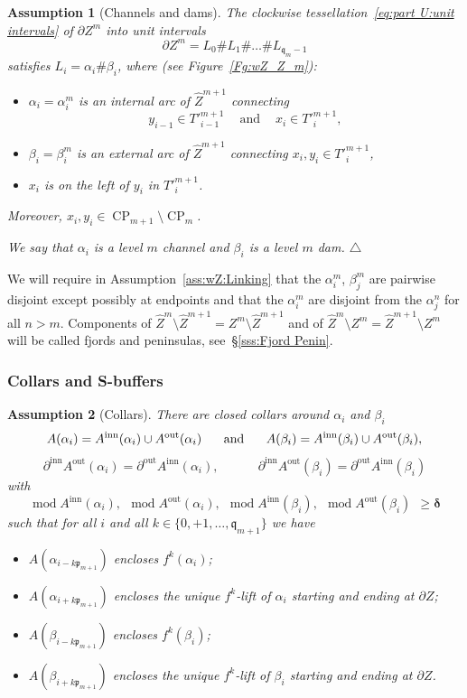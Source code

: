 \documentclass{amsart}
\newcommand\xqed[1]{%
  \leavevmode\unskip\penalty9999 \hbox{}\nobreak\hfill
  \quad\hbox{#1}}
\newcommand\tqed{\xqed{$\triangle$}}
\renewcommand{\sp}{{\ \ }}
\newcommand{\1}{{\mathbb 1 }}
\newcommand{\reminder}[1]{\textsl{$\lhd\rhd$#1$\lhd\rhd$}\marginpar{$\lhd\rhd\lhd\rhd\lhd\rhd$}}
\newcommand{\wZ}{{\widehat Z}}
\newcommand{\pp}{\mathfrak{p}}
\newcommand{\qq}{\mathfrak{q}}
\newcommand\inn{{\operatorname{inn}}}
\newcommand\out{{\operatorname{out}}}
\newtheorem{assum}{Assumption}
\theoremstyle{remark}
\numberwithin{equation}{section}
\theoremstyle{definition}
\renewcommand{\mod}{\operatorname{mod}}
\newcommand{\CP}{{\operatorname{CP}}}
\newcommand{\bdelta}{{\boldsymbol{ \delta}}}
\begin{document}
\begin{assum}[Channels and dams]
\label{ass:wZ:2}
The clockwise tessellation~\eqref{eq:part U:unit intervals} of $\partial Z^m$ into unit intervals
\[\partial Z^m=L_0\#L_1\#\dots\# L_{\qq_m-1}\] satisfies $L_i=\alpha_i\#\beta_i$, where (see Figure~\ref{Fg:wZ_Z_m}): 
\begin{itemize}
\item $\alpha_i=\alpha_i^m$ is an internal arc of $\widehat Z^{m+1}$ connecting \[y_{i-1}\in T'^{m+1}_{i-1} \sp\sp \text{ and }\sp\sp x_{i}\in  T'^{m+1}_{i},\]  
\item  $\beta_i=\beta_i^m$ is an external arc of $\widehat Z^{m+1}$ connecting $x_{i},y_{i}\in T'^{m+1}_{i}$,
\item $x_i$ is on the left of $y_i$ in $T'^{m+1}_i$.
\end{itemize}
Moreover, $x_i,y_i \in \CP_{m+1}\setminus \CP_m$.


We say that $\alpha_i$ is a \emph{level $m$ channel} and  $\beta_i$ is a \emph{level $m$ dam}.\tqed
\end{assum}

We will require in Assumption~\ref{ass:wZ:Linking} that the $\alpha^m_i$, $\beta^m_j$ are pairwise disjoint except possibly at endpoints and that the $\alpha^m_i$ are disjoint from the $\alpha^n_j$ for all $n>m$. Components of $\wZ^m\setminus \wZ^{m+1}=Z^m\setminus\wZ^{m+1} $ and of $\wZ^{m}\setminus Z^m=\wZ^{m+1}\setminus Z^m$ will be called fjords and peninsulas, see~\S\ref{sss:Fjord Penin}.





\subsubsection{Collars and S-buffers} 
\begin{assum}[Collars]
\label{ass:wZ:collars}
There are closed collars around $\alpha_i$ and $\beta_i$  \[A(\alpha_i)=A^\inn (\alpha_i)\cup A^\out(\alpha_i)\hspace{0.5cm} \text{ and }\hspace{0.5cm} A(\beta_i)=A^\inn(\beta_i) \cup A^\out(\beta_i),\]
\[ \partial ^\inn A^\out (\alpha_i) = \partial ^\out A^\inn (\alpha_i), \sp\sp\sp\sp\sp\sp\sp \partial ^\inn A^\out (\beta_i) = \partial ^\out A^\inn (\beta_i) \]
with 
\[  \mod A^\inn (\alpha_i),\sp  \mod A^\out (\alpha_i),\sp \mod A^\inn (\beta_i),\sp  \mod A^\out (\beta_i)\sp \ge \bdelta \]
such that for all $i$ and all $k\in \{0,+1,\dots, \qq_{m+1}\}$ we have
\begin{itemize}
\item $A(\alpha_{i - k \pp_{m+1}})$ encloses $f^{k} (\alpha_i)$;
\item $A(\alpha_{i + k \pp_{m+1}})$ encloses the unique $f^k$-lift of $\alpha_i$ starting and ending at $\partial Z$;
\item $A(\beta_{i - k \pp_{m+1}})$ encloses $f^{k} (\beta_i)$;
\item $A(\beta_{i +k \pp_{m+1}})$ encloses the unique $f^k$-lift of $\beta_i$ starting and ending at $\partial Z$.
\end{itemize}
\end{assum}
\end{document}
